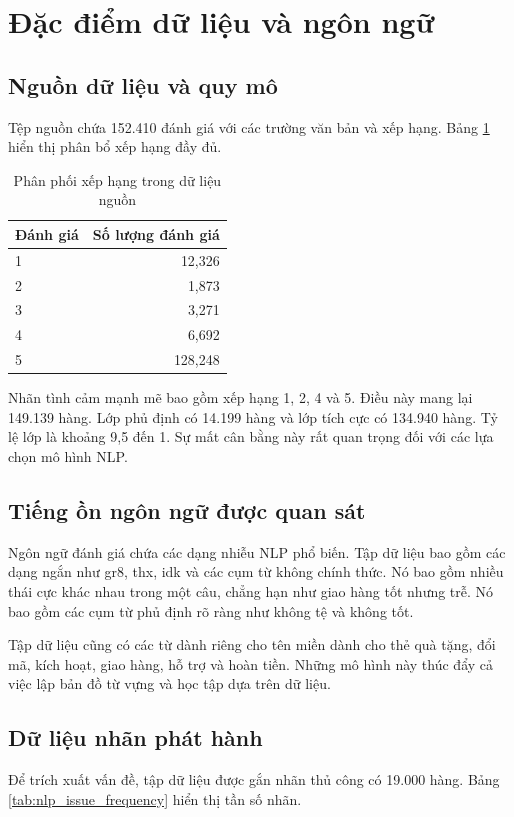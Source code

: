 \documentclass[12pt,a4paper]{article}
\begin{document}
\section{Đặc điểm dữ liệu và ngôn ngữ}
\subsection{Nguồn dữ liệu và quy mô}
Tệp nguồn chứa 152.410 đánh giá với các trường văn bản và xếp hạng. Bảng \ref{tab:nlp_rating_distribution} hiển thị phân bổ xếp hạng đầy đủ.

\begin{table}[H]
\centering
\caption{Phân phối xếp hạng trong dữ liệu nguồn}
\label{tab:nlp_rating_distribution}
\begin{tabular}{lr}
\toprule
Đánh giá & Số lượng đánh giá \\
\midrule
1 & 12,326 \\
2 & 1,873 \\
3 & 3,271 \\
4 & 6,692 \\
5 & 128,248 \\
\bottomrule
\end{tabular}
\end{table}

Nhãn tình cảm mạnh mẽ bao gồm xếp hạng 1, 2, 4 và 5. Điều này mang lại 149.139 hàng. Lớp phủ định có 14.199 hàng và lớp tích cực có 134.940 hàng. Tỷ lệ lớp là khoảng 9,5 đến 1. Sự mất cân bằng này rất quan trọng đối với các lựa chọn mô hình NLP.

\subsection{Tiếng ồn ngôn ngữ được quan sát}
Ngôn ngữ đánh giá chứa các dạng nhiễu NLP phổ biến. Tập dữ liệu bao gồm các dạng ngắn như gr8, thx, idk và các cụm từ không chính thức. Nó bao gồm nhiều thái cực khác nhau trong một câu, chẳng hạn như giao hàng tốt nhưng trễ. Nó bao gồm các cụm từ phủ định rõ ràng như không tệ và không tốt.

Tập dữ liệu cũng có các từ dành riêng cho tên miền dành cho thẻ quà tặng, đổi mã, kích hoạt, giao hàng, hỗ trợ và hoàn tiền. Những mô hình này thúc đẩy cả việc lập bản đồ từ vựng và học tập dựa trên dữ liệu.

\subsection{Dữ liệu nhãn phát hành}
Để trích xuất vấn đề, tập dữ liệu được gắn nhãn thủ công có 19.000 hàng. Bảng \ref{tab:nlp_issue_frequency} hiển thị tần số nhãn.
\end{document}
